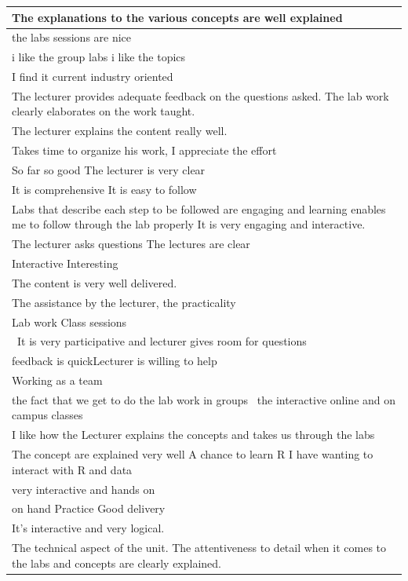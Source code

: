 \documentclass[
]{article}
\begin{document}
\begin{longtable}[t]{>{\raggedright\arraybackslash}p{35em}}
\hline
The explanations to the various concepts are well explained \\
\hline
the labs sessions are nice\\
\hline
i like the group labs  i like the topics\\
\hline
I find it current industry oriented\\
\hline
The lecturer provides adequate feedback on the questions asked.  The lab work clearly elaborates on the work taught.\\
\hline
The lecturer explains the content really well.\\
\hline
Takes time to organize his work, I appreciate the effort\\
\hline
So far so good  The lecturer is very clear\\
\hline
It is comprehensive  It is easy to follow\\
\hline
Labs that describe each step to be followed are engaging and learning enables me to follow through the lab properly  It is very engaging and interactive.\\
\hline
The lecturer asks questions  The lectures are clear \\
\hline
Interactive  Interesting \\
\hline
The content is very well delivered.\\
\hline
The assistance by the lecturer, the practicality\\
\hline
Lab work  Class sessions\\
\hline
 It is very participative and lecturer gives room for questions\\
\hline
feedback is quickLecturer is willing to help\\
\hline
Working as a team\\
\hline
the fact that we get to do the lab work in groups   the interactive online and on campus classes\\
\hline
I like how the Lecturer explains the concepts and takes us through the labs\\
\hline
The concept are explained very well  A chance to learn R I have wanting to interact with R and data\\
\hline
very interactive and hands on\\
\hline
on hand Practice  Good delivery\\
\hline
It’s interactive and very logical.\\
\hline
The technical aspect of the unit.  The attentiveness to detail when it comes to the labs and concepts are clearly explained.\\

\end{longtable}
\end{document}
